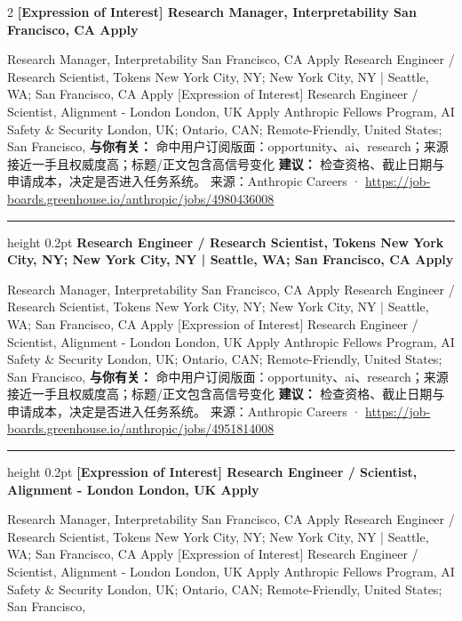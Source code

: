 \documentclass[10.5pt]{ctexart}
\begin{document}
\begin{multicols}{2}
{\large\bfseries [Expression of Interest] Research Manager, Interpretability San Francisco, CA Apply}\par
[Expression of Interest] Research Manager, Interpretability San Francisco, CA Apply Research Engineer / Research Scientist, Tokens New York City, NY; New York City, NY | Seattle, WA; San Francisco, CA Apply [Expression of Interest] Research Engineer / Scientist, Alignment - London London, UK Apply Anthropic Fellows Program, AI Safety \& Security London, UK; Ontario, CAN; Remote-Friendly, United States; San Francisco, 
\textbf{与你有关：} 命中用户订阅版面：opportunity、ai、research；来源接近一手且权威度高；标题/正文包含高信号变化
\textbf{建议：} 检查资格、截止日期与申请成本，决定是否进入任务系统。
{\footnotesize\color{ormuted} 来源：Anthropic Careers · \url{https://job-boards.greenhouse.io/anthropic/jobs/4980436008}}
\vspace{2mm}
\hrule height 0.2pt
\vspace{2mm}
{\large\bfseries Research Engineer / Research Scientist, Tokens New York City, NY; New York City, NY | Seattle, WA; San Francisco, CA Apply}\par
[Expression of Interest] Research Manager, Interpretability San Francisco, CA Apply Research Engineer / Research Scientist, Tokens New York City, NY; New York City, NY | Seattle, WA; San Francisco, CA Apply [Expression of Interest] Research Engineer / Scientist, Alignment - London London, UK Apply Anthropic Fellows Program, AI Safety \& Security London, UK; Ontario, CAN; Remote-Friendly, United States; San Francisco, 
\textbf{与你有关：} 命中用户订阅版面：opportunity、ai、research；来源接近一手且权威度高；标题/正文包含高信号变化
\textbf{建议：} 检查资格、截止日期与申请成本，决定是否进入任务系统。
{\footnotesize\color{ormuted} 来源：Anthropic Careers · \url{https://job-boards.greenhouse.io/anthropic/jobs/4951814008}}
\vspace{2mm}
\hrule height 0.2pt
\vspace{2mm}
{\large\bfseries [Expression of Interest] Research Engineer / Scientist, Alignment - London London, UK Apply}\par
[Expression of Interest] Research Manager, Interpretability San Francisco, CA Apply Research Engineer / Research Scientist, Tokens New York City, NY; New York City, NY | Seattle, WA; San Francisco, CA Apply [Expression of Interest] Research Engineer / Scientist, Alignment - London London, UK Apply Anthropic Fellows Program, AI Safety \& Security London, UK; Ontario, CAN; Remote-Friendly, United States; San Francisco, 

\end{multicols}
\end{document}
